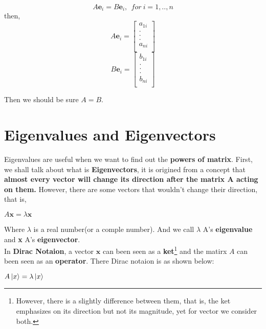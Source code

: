 \documentclass[12pt]{article}
\begin{document}
\begin{center}
    \[ A\mathbf{e}_i = B\mathbf{e}_i,\ \ for\ i = 1, .. , n \]
    then,
    \[ A\mathbf{e}_i = \begin{bmatrix}
        a_{1i}\\
        .\\.\\.\\
        a_{ni}\\
    \end{bmatrix} \]
    \[ B\mathbf{e}_i = \begin{bmatrix}
        b_{1i}\\
        .\\.\\.\\
        b_{ni}\\
    \end{bmatrix} \]
\end{center}

Then we should be sure $A = B$.

\section{Eigenvalues and Eigenvectors}

Eigenvalues are useful when we want to find out the \textbf{powers of matrix}. First, we shall talk about what is \textbf{Eigenvectors}, it is origined from a concept that \textbf{almost every vector will change its direction after the matrix A acting on them.} However, there are some vectors that wouldn't change their direction, that is,

\begin{center}
    $A\mathbf{x} = \lambda \mathbf{x}$
\end{center}

Where $\lambda$ is a real number(or a comple number).
And we call $\lambda$ A's \textbf{eigenvalue} and \textbf{x} A's \textbf{eigenvector}.
\\
In \textbf{Dirac Notaion}, a vector $\mathbf{x}$ can been seen as a \textbf{ket}\footnote{However, there is a slightly difference between them, that is, the ket emphasizes on its direction but not its magnitude, yet for vector we consider both.} and the matirx $A$ can been seen as an \textbf{operator}. There Dirac notaion is as shown below:

\begin{center}
   $A\ket*{x} = \lambda \ket*{x}$ 
\end{center}
\end{document}
